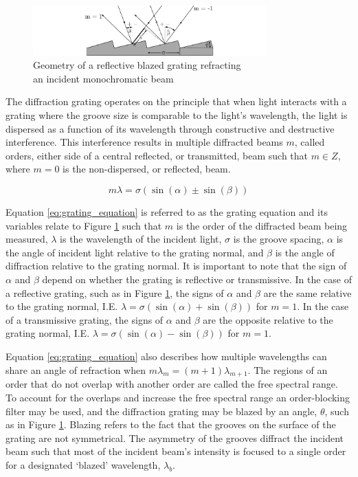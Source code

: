 \begin{figure}[t]
    \centering
    \includegraphics[width = 9cm]{figures/2_grating_diagram.pdf}
    \caption{Geometry of a reflective blazed grating refracting\\an incident monochromatic beam}
    \label{fig:grating_diagram}
\end{figure}

The diffraction grating operates on the principle that when light interacts with a grating where the groove size is comparable to the light's wavelength, the light is dispersed as a function of its wavelength through constructive and destructive interference. This interference results in multiple diffracted beams $m$, called orders, either side of a central reflected, or transmitted, beam such that $m \in Z$, where $m = 0$ is the non-dispersed, or reflected, beam.

\begin{equation}
    m\lambda = \sigma (\sin(\alpha) \pm \sin(\beta))
    \label{eq:grating_equation}
\end{equation}

Equation \ref{eq:grating_equation} is referred to as the grating equation and its variables relate to Figure \ref{fig:grating_diagram} such that $m$ is the order of the diffracted beam being measured, $\lambda$ is the wavelength of the incident light, $\sigma$ is the groove spacing, $\alpha$ is the angle of incident light relative to the grating normal, and $\beta$ is the angle of diffraction relative to the grating normal. It is important to note that the sign of $\alpha$ and $\beta$ depend on whether the grating is reflective or transmissive. In the case of a reflective grating, such as in Figure \ref{fig:grating_diagram}, the signs of $\alpha$ and $\beta$ are the same relative to the grating normal, I.E. $\lambda = \sigma (\sin(\alpha) + \sin(\beta))$ for $m = 1$. In the case of a transmissive grating, the signs of $\alpha$ and $\beta$ are the opposite relative to the grating normal, I.E. $\lambda = \sigma (\sin(\alpha) - \sin(\beta))$ for $m = 1$.
\prgph

Equation \ref{eq:grating_equation} also describes how multiple wavelengths can share an angle of refraction when $m\lambda_{m} = (m + 1)\lambda_{m + 1}$. The regions of an order that do not overlap with another order are called the free spectral range. To account for the overlaps and increase the free spectral range an order-blocking filter may be used, and the diffraction grating may be blazed by an angle, $\theta$, such as in Figure \ref{fig:grating_diagram}. Blazing refers to the fact that the grooves on the surface of the grating are not symmetrical. The asymmetry of the grooves diffract the incident beam such that most of the incident beam's intensity is focused to a single order for a designated `blazed' wavelength, $\lambda_{b}$.

